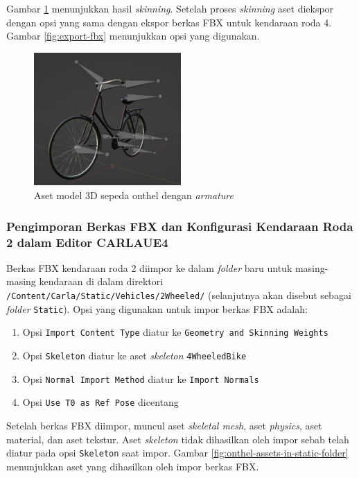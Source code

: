 Gambar \ref{fig:onthel-model-with-armature} menunjukkan hasil \textit{skinning}.
Setelah proses \textit{skinning} aset diekspor dengan opsi yang sama
dengan ekspor berkas FBX untuk kendaraan roda 4. Gambar \ref{fig:export-fbx}
menunjukkan opsi yang digunakan.

\begin{figure}[!h]
    \centering
    \includegraphics[width=0.5\textwidth]{resources/chapter-4/sepeda-onthel-model-2.png}
    \caption{Aset model 3D sepeda onthel dengan \textit{armature}}
    \label{fig:onthel-model-with-armature}
\end{figure}

\subsubsection{Pengimporan Berkas FBX dan Konfigurasi Kendaraan Roda 2 dalam Editor CARLAUE4}

Berkas FBX kendaraan roda 2 diimpor ke dalam \textit{folder} baru untuk
masing-masing kendaraan di dalam direktori
\verb|/Content/Carla/Static/Vehicles/2Wheeled/| (selanjutnya akan disebut
sebagai \textit{folder} \verb|Static|). Opsi yang digunakan untuk impor berkas
FBX adalah:

\begin{enumerate}
    \item Opsi \verb|Import Content Type| diatur ke \texttt{Geometry and Skinning Weights}
    \item Opsi \verb|Skeleton| diatur ke aset \textit{skeleton} \verb|4WheeledBike|
    \item Opsi \verb|Normal Import Method| diatur ke \verb|Import Normals|
    \item Opsi \verb|Use T0 as Ref Pose| dicentang
\end{enumerate}

Setelah berkas FBX diimpor, muncul aset \textit{skeletal mesh}, aset
\textit{physics}, aset material, dan aset tekstur. Aset \textit{skeleton} tidak
dihasilkan oleh impor sebab telah diatur pada opsi \verb|Skeleton| saat impor.
Gambar \ref{fig:onthel-assets-in-static-folder} menunjukkan aset yang dihasilkan
oleh impor berkas FBX.

